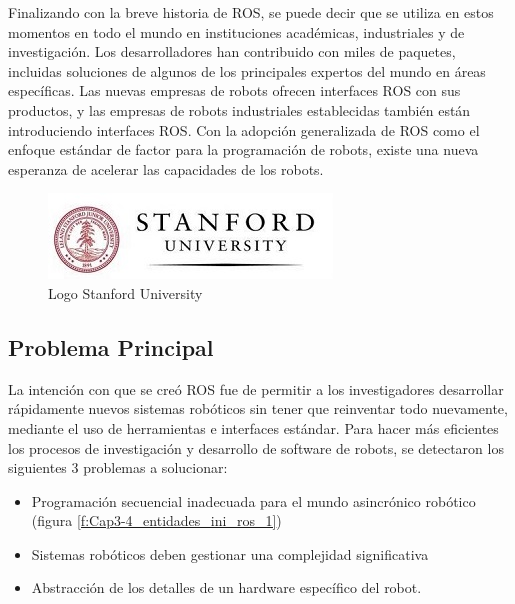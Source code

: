         Finalizando con la breve historia de ROS, se puede decir que se utiliza en estos momentos en todo el mundo en instituciones académicas, industriales y de investigación. Los desarrolladores han contribuido con miles de paquetes, incluidas soluciones de algunos de los principales expertos del mundo en áreas específicas. Las nuevas empresas de robots ofrecen interfaces ROS con sus productos, y las empresas de robots industriales establecidas también están introduciendo interfaces ROS. Con la adopción generalizada de ROS como el enfoque estándar de factor para la programación de robots, existe una nueva esperanza de acelerar las capacidades de los robots.
        
        \begin{figure}[htbp]
            \centering
            \includegraphics[width=0.6\linewidth]{Main/Chapter3/Images3/Stanford-University-logo1.jpg}
            \caption{Logo Stanford University \cite{stanford}} 
            \label{f:Cap3-4_entidades_inicio_ros_32}
        \end{figure}

    \newpage

    \subsection{Problema Principal}
    
    La intención con que se creó ROS fue de permitir a los investigadores desarrollar rápidamente nuevos sistemas robóticos sin tener que reinventar todo nuevamente, mediante el uso de herramientas e interfaces estándar. Para hacer más eficientes los procesos de investigación y desarrollo de software de robots, se detectaron los siguientes 3 problemas a solucionar:
    
    \begin{itemize}
        \item {Programación secuencial inadecuada para el mundo asincrónico robótico (figura \ref{f:Cap3-4_entidades_ini_ros_1})}
        \item {Sistemas robóticos deben gestionar una complejidad significativa}
        \item {Abstracción de los detalles de un hardware específico del robot.}
    \end{itemize}


